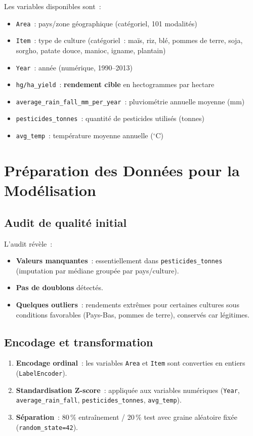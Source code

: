 Les variables disponibles sont~:
\begin{itemize}[leftmargin=1.5cm, itemsep=2pt]
  \item \texttt{Area}~: pays/zone géographique (catégoriel, 101 modalités)
  \item \texttt{Item}~: type de culture (catégoriel~: maïs, riz, blé, pommes de terre, soja, sorgho, patate douce, manioc, igname, plantain)
  \item \texttt{Year}~: année (numérique, 1990--2013)
  \item \texttt{hg/ha\_yield}~: \textbf{rendement cible} en hectogrammes par hectare
  \item \texttt{average\_rain\_fall\_mm\_per\_year}~: pluviométrie annuelle moyenne (mm)
  \item \texttt{pesticides\_tonnes}~: quantité de pesticides utilisés (tonnes)
  \item \texttt{avg\_temp}~: température moyenne annuelle ($^\circ$C)
\end{itemize}

\section{Préparation des Données pour la Modélisation}

\subsection{Audit de qualité initial}

L'audit révèle~:
\begin{itemize}[leftmargin=1.5cm, itemsep=2pt]
  \item \textbf{Valeurs manquantes}~: essentiellement dans \texttt{pesticides\_tonnes} (imputation par médiane groupée par pays/culture).
  \item \textbf{Pas de doublons} détectés.
  \item \textbf{Quelques outliers}~: rendements extrêmes pour certaines cultures sous conditions favorables (Pays-Bas, pommes de terre), conservés car légitimes.
\end{itemize}

\subsection{Encodage et transformation}

\begin{enumerate}[leftmargin=1.5cm, itemsep=3pt]
  \item \textbf{Encodage ordinal}~: les variables \texttt{Area} et \texttt{Item} sont converties en entiers (\texttt{LabelEncoder}).
  \item \textbf{Standardisation Z-score}~: appliquée aux variables numériques (\texttt{Year}, \texttt{average\_rain\_fall}, \texttt{pesticides\_tonnes}, \texttt{avg\_temp}).
  \item \textbf{Séparation}~: 80\,\% entraînement / 20\,\% test avec graine aléatoire fixée (\texttt{random\_state=42}).
\end{enumerate}

